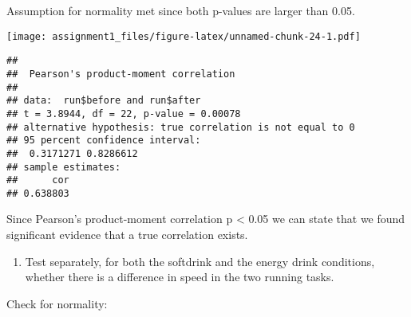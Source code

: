\documentclass[
]{article}
\newenvironment{Shaded}{\begin{snugshade}}{\end{snugshade}}
\newcommand{\AttributeTok}[1]{\textcolor[rgb]{0.77,0.63,0.00}{#1}}
\newcommand{\CommentTok}[1]{\textcolor[rgb]{0.56,0.35,0.01}{\textit{#1}}}
\newcommand{\FunctionTok}[1]{\textcolor[rgb]{0.00,0.00,0.00}{#1}}
\newcommand{\NormalTok}[1]{#1}
\newcommand{\SpecialCharTok}[1]{\textcolor[rgb]{0.00,0.00,0.00}{#1}}
\newcommand{\StringTok}[1]{\textcolor[rgb]{0.31,0.60,0.02}{#1}}
\providecommand{\tightlist}{%
  \setlength{\itemsep}{0pt}\setlength{\parskip}{0pt}}
\begin{document}
Assumption for normality met since both p-values are larger than 0.05.

\begin{Shaded}
\end{Shaded}

\texttt{[image: assignment1\_files/figure-latex/unnamed-chunk-24-1.pdf]}

\begin{Shaded}
\end{Shaded}

\begin{verbatim}
## 
##  Pearson's product-moment correlation
## 
## data:  run$before and run$after
## t = 3.8944, df = 22, p-value = 0.00078
## alternative hypothesis: true correlation is not equal to 0
## 95 percent confidence interval:
##  0.3171271 0.8286612
## sample estimates:
##      cor 
## 0.638803
\end{verbatim}

Since Pearson's product-moment correlation p \textless{} 0.05 we can
state that we found significant evidence that a true correlation exists.

\begin{enumerate}
\def\labelenumi{\alph{enumi})}
\setcounter{enumi}{1}
\tightlist
\item
  Test separately, for both the softdrink and the energy drink
  conditions, whether there is a difference in speed in the two running
  tasks.
\end{enumerate}

Check for normality:

\begin{Shaded}
\end{Shaded}
\end{document}
